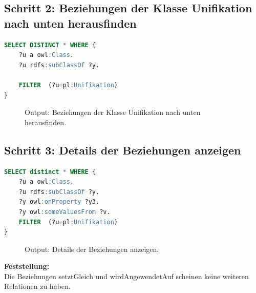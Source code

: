 \subsection{Schritt 2: Beziehungen der Klasse Unifikation nach unten herausfinden}
\label{ssec:anh_beispiel_c_2}

\begin{lstlisting}[caption={Beziehungen der Klasse Unifikation nach unten herausfinden},captionpos=b,language=SQL]
SELECT DISTINCT * WHERE { 
	?u a owl:Class.
	?u rdfs:subClassOf ?y.
	
	FILTER  (?u=pl:Unifikation)
}

\end{lstlisting}

\begin{figure}[H]
\centering {}
\caption{Output: Beziehungen der Klasse Unifikation nach unten herausfinden.\label{fig:prolog_2}\protect\footnotemark}
\end{figure}

\subsection{Schritt 3: Details der Beziehungen anzeigen}
\label{ssec:anh_beispiel_c_3}

\begin{lstlisting}[caption={Details der Beziehungen anzeigen},captionpos=b,language=SQL]
SELECT distinct * WHERE { 
	?u a owl:Class.
	?u rdfs:subClassOf ?y.
	?y owl:onProperty ?y3.	
	?y owl:someValuesFrom ?v.
	FILTER  (?u=pl:Unifikation)
}

\end{lstlisting}

\begin{figure}[H]
\centering {}
\caption{Output: Details der Beziehungen anzeigen.\label{fig:prolog_3}\protect\footnotemark}
\end{figure}

\textbf{Feststellung:}\\ Die Beziehungen setztGleich und wirdAngewendetAuf scheinen keine weiteren Relationen zu haben. 


